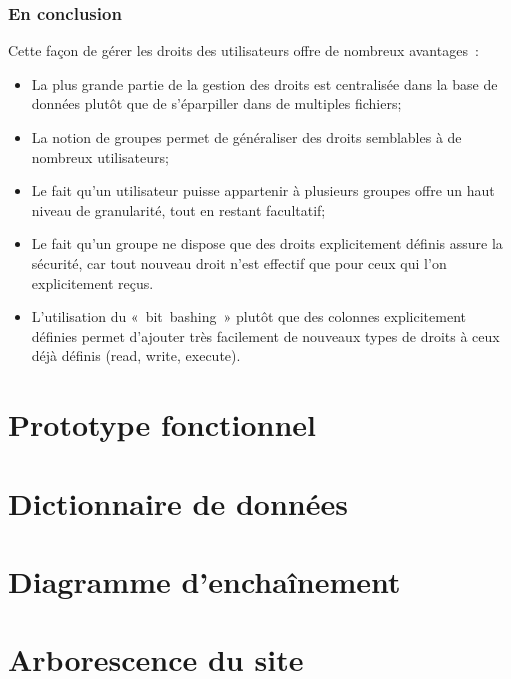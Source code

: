\documentclass[letter, 11pt]{report}
\begin{document}
\subsection{En conclusion}
Cette façon de gérer les droits des utilisateurs offre de nombreux avantages~:

\begin{itemize}
	\item La plus grande partie de la gestion des droits est centralisée dans la base de données plutôt que de s'éparpiller dans de multiples fichiers;
	\item La notion de groupes permet de généraliser des droits semblables à de nombreux utilisateurs;
	\item Le fait qu'un utilisateur puisse appartenir à plusieurs groupes offre un haut niveau de granularité, tout en restant facultatif;
	\item Le fait qu'un groupe ne dispose que des droits explicitement définis assure la sécurité, car tout nouveau droit n'est effectif que pour ceux qui l'on explicitement reçus.
	\item L'utilisation du «~bit~bashing~» plutôt que des colonnes explicitement définies permet d'ajouter très facilement de nouveaux types de droits à ceux déjà définis (read, write, execute).
\end{itemize}

\chapter{Prototype fonctionnel}

\appendix

\chapter{Dictionnaire de données}


\chapter{Diagramme d'enchaînement}


\chapter{Arborescence du site}


\listoffigures
\listoftables
\end{document}

